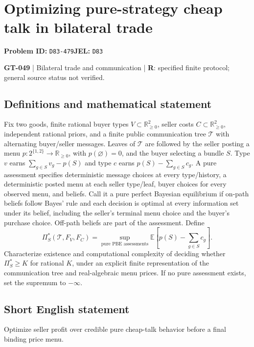 \documentclass[11pt,a4paper]{article}
\begin{document}
\section*{Optimizing pure-strategy cheap talk in bilateral trade}
\textbf{Problem ID:} \texttt{D83-479}\quad \textbf{JEL:} \texttt{D83}\par
\label{problem:OP-0179}
\label{game:GT-049}
{\sffamily\small\color{muted}
\textbf{GT-049} | Bilateral trade and communication | \textbf{R}: specified finite protocol; general source status not verified.
\par}
\subsection*{Definitions and mathematical statement}
Fix two goods, finite rational buyer types $V\subset\mathbb R_{\geq0}^2$, seller costs $C\subset\mathbb R_{\geq0}^2$, independent rational priors, and a finite public communication tree $\mathcal T$ with alternating buyer/seller messages. Leaves of $\mathcal T$ are followed by the seller posting a menu $p:2^{\{1,2\}}\to\mathbb R_{\geq0}$, with $p(\varnothing)=0$, and the buyer selecting a bundle $S$. Type $v$ earns $\sum_{g\in S}v_g-p(S)$ and type $c$ earns $p(S)-\sum_{g\in S}c_g$.
A pure assessment specifies deterministic message choices at every type/history, a deterministic posted menu at each seller type/leaf, buyer choices for every observed menu, and beliefs. Call it a pure perfect Bayesian equilibrium if on-path beliefs follow Bayes' rule and each decision is optimal at every information set under its belief, including the seller's terminal menu choice and the buyer's purchase choice. Off-path beliefs are part of the assessment. Define
\[
 \Pi_S^*(\mathcal T,F_V,F_C)=
 \sup_{\text{pure PBE assessments}}\mathbb E\left[p(S)-\sum_{g\in S}c_g\right].
\]
Characterize existence and computational complexity of deciding whether $\Pi_S^*\geq K$ for rational $K$, under an explicit finite representation of the communication tree and real-algebraic menu prices. If no pure assessment exists, set the supremum to $-\infty$.
\subsection*{Short English statement}
Optimize seller profit over credible pure cheap-talk behavior before a final binding price menu.
\end{document}
